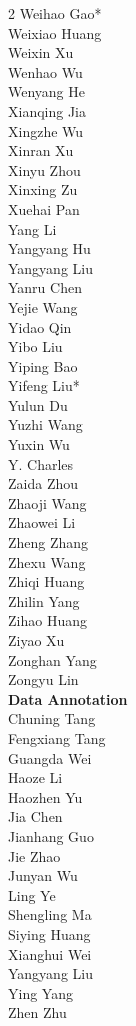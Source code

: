 \documentclass{article}
\begin{document}
\begin{multicols}{2}
Weihao Gao* \\
Weixiao Huang \\
Weixin Xu \\
Wenhao Wu \\
Wenyang He \\
Xianqing Jia \\
Xingzhe Wu \\
Xinran Xu \\
Xinyu Zhou \\
Xinxing Zu \\
Xuehai Pan \\
Yang Li \\
Yangyang Hu \\
Yangyang Liu \\
Yanru Chen \\
Yejie Wang \\
Yidao Qin \\
Yibo Liu \\
Yiping Bao \\
Yifeng Liu* \\
Yulun Du \\
Yuzhi Wang \\
Yuxin Wu \\
Y. Charles \\
Zaida Zhou \\
Zhaoji Wang \\
Zhaowei Li \\
Zheng Zhang \\
Zhexu Wang \\
Zhiqi Huang \\
Zhilin Yang \\
Zihao Huang \\
Ziyao Xu \\
Zonghan Yang \\
Zongyu Lin \\

\noindent
\textbf{Data Annotation} \\

Chuning Tang \\
Fengxiang Tang  \\
Guangda Wei \\
Haoze Li \\
Haozhen Yu \\
Jia Chen \\
Jianhang Guo \\
Jie Zhao \\
Junyan Wu \\
Ling Ye \\
Shengling Ma \\
Siying Huang \\
Xianghui Wei \\
Yangyang Liu \\
Ying Yang \\
Zhen Zhu \\



\end{multicols}
\end{document}

